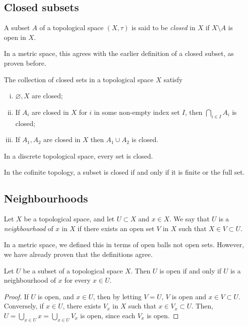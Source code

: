 \subsection{Closed subsets}
\begin{definition}
	A subset \( A \) of a topological space \( (X, \tau) \) is said to be \textit{closed} in \( X \) if \( X \setminus A \) is open in \( X \).
\end{definition}
\begin{remark}
	In a metric space, this agrees with the earlier definition of a closed subset, as proven before.
\end{remark}
\begin{proposition}
	The collection of closed sets in a topological space \( X \) satisfy
	\begin{enumerate}[(i)]
		\item \( \varnothing, X \) are closed;
		\item If \( A_i \) are closed in \( X \) for \( i \) in some non-empty index set \( I \), then \( \bigcap_{i \in I} A_i \) is closed;
		\item If \( A_1, A_2 \) are closed in \( X \) then \( A_1 \cup A_2 \) is closed.
	\end{enumerate}
\end{proposition}
\begin{example}
	In a discrete topological space, every set is closed.
\end{example}
\begin{example}
	In the cofinite topology, a subset is closed if and only if it is finite or the full set.
\end{example}

\subsection{Neighbourhoods}
\begin{definition}
	Let \( X \) be a topological space, and let \( U \subset X \) and \( x \in X \).
	We say that \( U \) is a \textit{neighbourhood} of \( x \) in \( X \) if there exists an open set \( V \) in \( X \) such that \( X \in V \subset U \).
\end{definition}
\begin{remark}
	In a metric space, we defined this in terms of open balls not open sets.
	However, we have already proven that the definitions agree.
\end{remark}
\begin{proposition}
	Let \( U \) be a subset of a topological space \( X \).
	Then \( U \) is open if and only if \( U \) is a neighbourhood of \( x \) for every \( x \in U \).
\end{proposition}
\begin{proof}
	If \( U \) is open, and \( x \in U \), then by letting \( V = U \), \( V \) is open and \( x \in V \subset U \).
	Conversely, if \( x \in U \), there exists \( V_x \) in \( X \) such that \( x \in V_x \subset U \).
	Then, \( U = \bigcup_{x \in U} x = \bigcup_{x \in U} V_x \) is open, since each \( V_x \) is open.
\end{proof}

